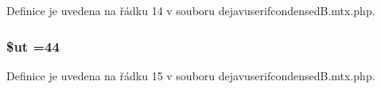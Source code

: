 Definice je uvedena na řádku 14 v souboru dejavuserifcondensed\-B.\-mtx.\-php.

\hypertarget{dejavuserifcondensed_b_8mtx_8php_aadd3f841051043ee58e587e840e8dd0b}{
\subsubsection[{\$ut}]{\setlength{\rightskip}{0pt plus 5cm}\$ut =44}}\label{dejavuserifcondensed_b_8mtx_8php_aadd3f841051043ee58e587e840e8dd0b}


Definice je uvedena na řádku 15 v souboru dejavuserifcondensed\-B.\-mtx.\-php.

